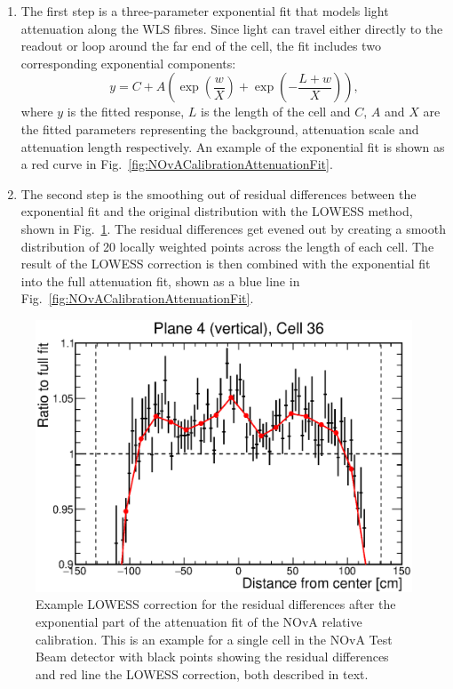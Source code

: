 \begin{enumerate}
\item The first step is a three-parameter exponential fit that models light attenuation along the \gls{WLS} fibres. Since light can travel either directly to the readout or loop around the far end of the cell, the fit includes two corresponding exponential components:
\begin{equation}\label{eq:NOvARelCalibExpFit}
y=C+A\left(\exp\left(\frac{w}{X}\right)+\exp\left(-\frac{L+w}{X}\right)\right),
\end{equation}
where $y$ is the fitted response, $L$ is the length of the cell and $C$, $A$ and $X$ are the fitted parameters representing the background, attenuation scale and attenuation length respectively. An example of the exponential fit is shown as a red curve in Fig.~\ref{fig:NOvACalibrationAttenuationFit}.
\item The second step is the smoothing out of residual differences between the exponential fit and the original distribution with the \gls{LOWESS} method, shown in Fig.~\ref{fig:NOvACalibrationLOWESSCorrection}. The residual differences get evened out by creating a smooth distribution of 20 locally weighted points across the length of each cell. The result of the \gls{LOWESS} correction is then combined with the exponential fit into the full attenuation fit, shown as a blue line in Fig.~\ref{fig:NOvACalibrationAttenuationFit}.
\end{enumerate}

\begin{figure}
    \centering
    \includegraphics[width=.7\textwidth]{Plots/NOvAExperiment/ExampleLOWESSFit.eps}
    \caption[Example LOWESS correction for NOvA relative calibration]{Example \acrshort{LOWESS} correction for the residual differences after the exponential part of the attenuation fit of the \acrshort{NOvA} relative calibration. This is an example for a single cell in the \acrshort{NOvA} Test Beam detector with black points showing the residual differences and red line the \acrshort{LOWESS} correction, both described in text.}
    \label{fig:NOvACalibrationLOWESSCorrection}
\end{figure}

